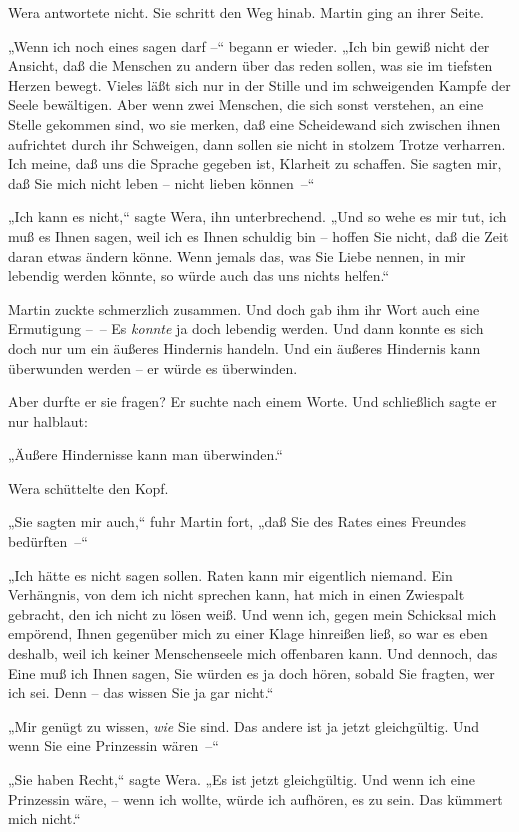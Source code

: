 Wera antwortete nicht. Sie schritt den Weg hinab. Martin ging an
ihrer Seite.

„Wenn ich noch eines sagen darf –“ begann er wieder. „Ich bin gewiß
nicht der Ansicht, daß die Menschen zu andern über das reden
sollen, was sie im tiefsten Herzen bewegt. Vieles läßt sich nur in
der Stille und im schweigenden Kampfe der Seele bewältigen. Aber
wenn zwei Menschen, die sich sonst verstehen, an eine Stelle
gekommen sind, wo sie merken, daß eine Scheidewand sich zwischen
ihnen aufrichtet durch ihr Schweigen, dann sollen sie nicht in
stolzem Trotze verharren. Ich meine, daß uns die Sprache gegeben
ist, Klarheit zu schaffen. Sie sagten mir, daß Sie mich nicht leben
– nicht lieben können~–“

„Ich kann es nicht,“ sagte Wera, ihn unterbrechend. „Und so wehe es
mir tut, ich muß es Ihnen sagen, weil ich es Ihnen schuldig bin –
hoffen Sie nicht, daß die Zeit daran etwas ändern könne. Wenn
jemals das, was Sie Liebe nennen, in mir lebendig werden könnte, so
würde auch das uns nichts helfen.“

Martin zuckte schmerzlich zusammen. Und doch gab ihm ihr Wort auch
eine Ermutigung –~– Es \emph{konnte} ja doch lebendig werden. Und
dann konnte es sich doch nur um ein äußeres Hindernis handeln. Und
ein äußeres Hindernis kann überwunden werden – er würde es
überwinden.

Aber durfte er sie fragen? Er suchte nach einem Worte. Und
schließlich sagte er nur halblaut:

„Äußere Hindernisse kann man überwinden.“

Wera schüttelte den Kopf.

„Sie sagten mir auch,“ fuhr Martin fort, „daß Sie des Rates eines
Freundes bedürften~–“

„Ich hätte es nicht sagen sollen. Raten kann mir eigentlich
niemand. Ein Verhängnis, von dem ich nicht sprechen kann, hat mich
in einen Zwiespalt gebracht, den ich nicht zu lösen weiß. Und wenn
ich, gegen mein Schicksal mich empörend, Ihnen gegenüber mich zu
einer Klage hinreißen ließ, so war es eben deshalb, weil ich keiner
Menschenseele mich offenbaren kann. Und dennoch, das Eine muß ich
Ihnen sagen, Sie würden es ja doch hören, sobald Sie fragten, wer
ich sei. Denn – das wissen Sie ja gar nicht.“

„Mir genügt zu wissen, \emph{wie} Sie sind. Das andere ist ja jetzt
gleichgültig. Und wenn Sie eine Prinzessin wären~–“

„Sie haben Recht,“ sagte Wera. „Es ist jetzt gleichgültig. Und wenn
ich eine Prinzessin wäre, – wenn ich wollte, würde ich aufhören, es
zu sein. Das kümmert mich nicht.“

